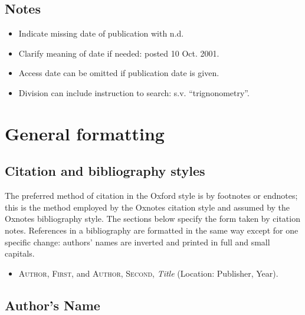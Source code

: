 \documentclass[extrafontsizes,11pt,a4paper,oneside]{memoir}
\newcommand*{\lit}[1]{\textsf{#1}}
\begin{document}
\section{Notes}

\begin{itemize}
  \item Indicate missing date of publication with n.d.
  \item Clarify meaning of date if needed: posted 10 Oct. 2001.
  \\
  \item Access date can be omitted if publication date is given.
  \item Division can include instruction to search: s.v. \enquote{trignonometry}.
\end{itemize}

\chapter{General formatting}

\section{Citation and bibliography styles}

The preferred method of citation in the Oxford style is by footnotes or endnotes; this is the method employed by the Oxnotes citation style and assumed by the Oxnotes bibliography style. The sections below specify the form taken by citation notes. References in a bibliography are formatted in the same way except for one specific change: authors' names are inverted and printed in full and small capitals.

\begin{itemize}
  \item
  \textsc{Author, First}, \lit{and} \textsc{Author, Second}, \emph{Title} (Location: Publisher, Year).
\end{itemize}

\section{Author's Name}
\end{document}
